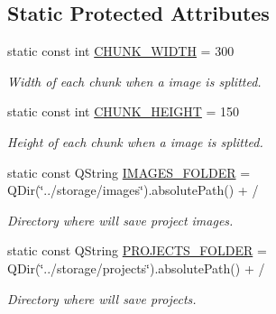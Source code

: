 \subsection*{Static Protected Attributes}
\begin{DoxyCompactItemize}
\item 
\mbox{\label{classContextualizationController_a8e94ee12efc5fb6aba91341b4cc47a26}} 
static const int \mbox{\hyperlink{classContextualizationController_a8e94ee12efc5fb6aba91341b4cc47a26}{C\+H\+U\+N\+K\+\_\+\+W\+I\+D\+TH}} = 300
\begin{DoxyCompactList}\small\item\em Width of each chunk when a image is splitted. \end{DoxyCompactList}\item 
\mbox{\label{classContextualizationController_ae9896f11f9e129fa4ea9d482c18d8b82}} 
static const int \mbox{\hyperlink{classContextualizationController_ae9896f11f9e129fa4ea9d482c18d8b82}{C\+H\+U\+N\+K\+\_\+\+H\+E\+I\+G\+HT}} = 150
\begin{DoxyCompactList}\small\item\em Height of each chunk when a image is splitted. \end{DoxyCompactList}\item 
\mbox{\label{classContextualizationController_a88ea18a10d1edd6cd15f41b6126e813e}} 
static const Q\+String \mbox{\hyperlink{classContextualizationController_a88ea18a10d1edd6cd15f41b6126e813e}{I\+M\+A\+G\+E\+S\+\_\+\+F\+O\+L\+D\+ER}} = Q\+Dir(\char`\"{}../storage/images\char`\"{}).absolute\+Path() + \textquotesingle{}/\textquotesingle{}
\begin{DoxyCompactList}\small\item\em Directory where will save project images. \end{DoxyCompactList}\item 
\mbox{\label{classContextualizationController_a33d73ba5d5ef0e4c7a47dbb85cea7a7e}} 
static const Q\+String \mbox{\hyperlink{classContextualizationController_a33d73ba5d5ef0e4c7a47dbb85cea7a7e}{P\+R\+O\+J\+E\+C\+T\+S\+\_\+\+F\+O\+L\+D\+ER}} = Q\+Dir(\char`\"{}../storage/projects\char`\"{}).absolute\+Path() + \textquotesingle{}/\textquotesingle{}
\begin{DoxyCompactList}\small\item\em Directory where will save projects. \end{DoxyCompactList}\item 

\end{DoxyCompactItemize}
